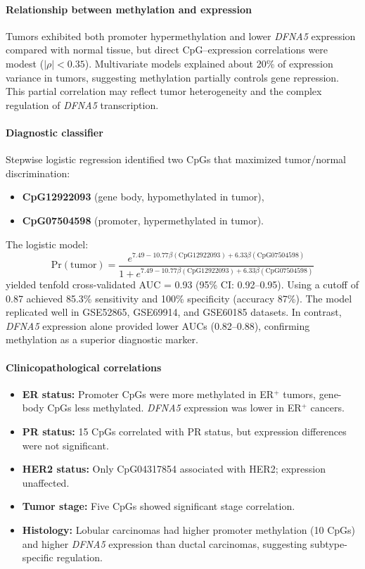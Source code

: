 \documentclass[10pt]{extarticle}
\begin{document}
\paragraph{Relationship between methylation and expression}
Tumors exhibited both promoter hypermethylation and lower \textit{DFNA5} expression compared with normal tissue, but direct CpG–expression correlations were modest ($|\rho|<0.35$). Multivariate models explained about 20\% of expression variance in tumors, suggesting methylation partially controls gene repression. This partial correlation may reflect tumor heterogeneity and the complex regulation of \textit{DFNA5} transcription.

\paragraph{Diagnostic classifier}
Stepwise logistic regression identified two CpGs that maximized tumor/normal discrimination:
\begin{itemize}[label=-]
\item \textbf{CpG12922093} (gene body, hypomethylated in tumor),
\item \textbf{CpG07504598} (promoter, hypermethylated in tumor).
\end{itemize}
The logistic model:
\[
\text{Pr}(\text{tumor}) = \frac{e^{7.49 - 10.77 \beta(\text{CpG12922093}) + 6.33 \beta(\text{CpG07504598})}}{1 + e^{7.49 - 10.77 \beta(\text{CpG12922093}) + 6.33 \beta(\text{CpG07504598})}}
\]
yielded tenfold cross-validated AUC = 0.93 (95\% CI: 0.92–0.95). Using a cutoff of 0.87 achieved 85.3\% sensitivity and 100\% specificity (accuracy 87\%). The model replicated well in GSE52865, GSE69914, and GSE60185 datasets. In contrast, \textit{DFNA5} expression alone provided lower AUCs (0.82–0.88), confirming methylation as a superior diagnostic marker.

\paragraph{Clinicopathological correlations}
\begin{itemize}[label=-]
\item \textbf{ER status:} Promoter CpGs were more methylated in ER$^+$ tumors, gene-body CpGs less methylated. \textit{DFNA5} expression was lower in ER$^+$ cancers.
\item \textbf{PR status:} 15 CpGs correlated with PR status, but expression differences were not significant.
\item \textbf{HER2 status:} Only CpG04317854 associated with HER2; expression unaffected.
\item \textbf{Tumor stage:} Five CpGs showed significant stage correlation.
\item \textbf{Histology:} Lobular carcinomas had higher promoter methylation (10 CpGs) and higher \textit{DFNA5} expression than ductal carcinomas, suggesting subtype-specific regulation.
\end{itemize}
\end{document}
